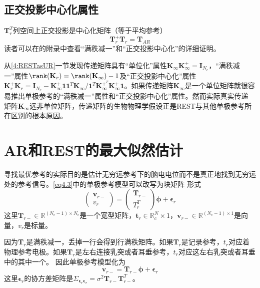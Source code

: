 \subsection{正交投影中心化属性} 
$\mathbf{T}_r^T$列空间上正交投影是中心化矩阵（等于平均参考）
\begin{equation}\label{eq4.14}
\mathbf{T}_r^+\mathbf{T}_r=\mathbf{T}_{AR}
\end{equation}
读者可以在\cite{hu_unified_2018}的附录中查看“满秩减一”和“正交投影中心化”的详细证明。

从\ref{4:RESTasUR}一节发现传递矩阵具有“单位化”属性$\mathbf{K}_{\infty}\mathbf{K}_{\infty}^+=\mathbf{I}_{N_c}$，“满秩减一”属性$\rank(\mathbf{K}_r)=\rank(\mathbf{K}_{\infty})-1$及“正交投影中心化”属性$\mathbf{K}_r^+\mathbf{K}_r=\mathbf{I}_{N_c}-\mathbf{K}_{\infty}^+\mathbf{11}^T\mathbf{K}_{\infty}/{\mathbf{1}^T\mathbf{K}_{\infty}^{+^T}\mathbf{K}_{\infty}^+\mathbf{1}}$。如果传递矩阵$\mathbf{K}_{\infty}$是一个单位矩阵就很容易推出单极参考的“满秩减一”属性和“正交投影中心化”属性。然而实际真实传递
矩阵$\mathbf{K}_{\infty}$远非单位矩阵，传递矩阵的生物物理学假设正是REST与其他单极参考所在区别的根本原因。

\section{AR和REST的最大似然估计}
寻找最优参考的实际目的是估计无穷远参考下的脑电电位而不是真正地找到无穷远处的参考信号。\eqref{eq4.3}中的单极参考模型可以改写为块矩阵
形式
\begin{equation}\label{eq4.15}
\begin{pmatrix}\mathbf{v}_{r-}\\v_r\end{pmatrix}=\begin{pmatrix}\mathbf{T}_{r-}\\T_r^T\end{pmatrix}\mathbf{\phi}+\mathbf{\epsilon}_r
\end{equation}
这里$\mathbf{T}_{r-}\in\mathbb{R}^{(N_c-1)\times{N_c}}$是一个宽型矩阵，$\mathbf{t}_r\in\mathbb{R}^N_c\times1$，$\mathbf{v}_{r-}\in\mathbb{R}^{(N_c-1)\times1}$是向量，$v_r$是标量。

因为$\mathbf{T}_r$是满秩减一，丢掉一行会得到行满秩矩阵。如果$\mathbf{T}_r$是记录参考，$t_r$对应着物理参考电极。如果$\mathbf{T}_r$是左右连接乳突或者耳垂参考，$t_r$对应这左右乳突或者耳垂中的其中一个。 因此单极参考模型化为
\begin{equation}\label{eq4.16}
\mathbf{v}_{r-}=\mathbf{T}_{r-}\mathbf{\phi}+\mathbf{\epsilon}_r
\end{equation}
这里$\mathbf{\epsilon}_r$的协方差矩阵是$\Sigma_{\mathbf{\epsilon}_r\mathbf{\epsilon}_r}=\sigma^2\mathbf{T}_{r-}\mathbf{T}_{r-}^T$。

